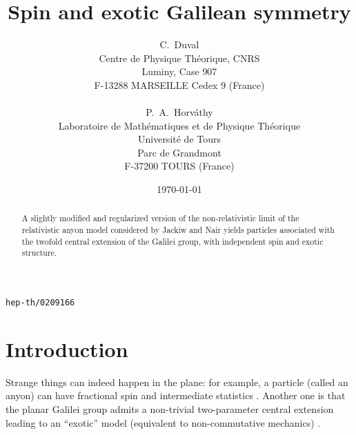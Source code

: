 \documentclass[a4paper,11pt]{article}
\let\ssection=\section
\renewcommand{\section}{\setcounter{equation}{0}\ssection}
\begin{document}
\setlength{\baselineskip}{16pt}

\title{Spin and exotic Galilean symmetry}

\author{
C.~Duval
\\
Centre de Physique Th\'eorique, CNRS\\
Luminy, Case 907\\
F-13288 MARSEILLE Cedex 9 (France)
\\
\\
P.~A.~Horv\'athy
\\
Laboratoire de Math\'ematiques et de Physique Th\'eorique\\
Universit\'e de Tours\\
Parc de Grandmont\\
F-37200 TOURS (France)
\\
}

\date{\today}

\maketitle


\begin{abstract}
   A slightly modified and regularized version of the non-relativistic
   limit of the relativistic anyon model
   considered by Jackiw and Nair yields particles
   associated with the twofold central extension of the
   Galilei group, with independent spin and exotic structure.

\end{abstract}

\vskip3mm
\texttt{hep-th/0209166}


\section{Introduction}

Strange things can indeed happen in the plane: for example,
a particle (called an anyon)
can have fractional spin and intermediate statistics
\cite{anyons}. Another one is that the planar Galilei group
admits a non-trivial two-parameter central
extension \cite{centralex1} leading to an ``exotic'' model
(equivalent to non-commutative mechanics) \cite{DH,NCQM}.
\end{document}
